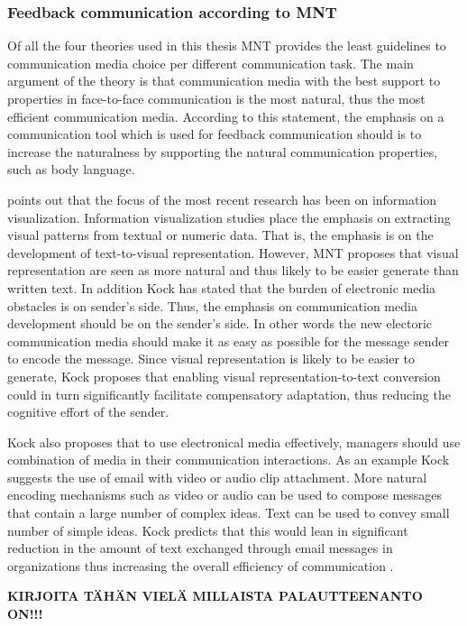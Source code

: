 \documentclass[english,12pt,a4paper,pdftex]{article}
\begin{document}
\subsubsection{Feedback communication according to MNT}

Of all the four theories used in this thesis \ac{MNT} provides the least guidelines to communication media choice per different communication task. The main argument of the theory is that communication media with the best support to properties in face-to-face communication is the most natural, thus the most efficient communication media. According to this statement, the emphasis on a communication tool which is used for feedback communication should is to increase the naturalness by supporting the natural communication properties, such as body language. \citep{kock2005} \citep{kock2004}

\citet{kock2007} points out that the focus of the most recent research has been on information visualization. Information visualization studies place the emphasis on extracting visual patterns from textual or numeric data. That is, the emphasis is on the development of text-to-visual representation. However, \ac{MNT} proposes that visual representation are seen as more natural and thus likely to be easier generate than written text. In addition Kock has stated that the burden of electronic media obstacles is on sender's side. Thus, the emphasis on communication media development should be on the sender's side. In other words the new electoric communication media should make it as easy as possible for the message sender to encode the message. Since visual representation is likely to be easier to generate, Kock proposes that enabling visual representation-to-text conversion could in turn significantly facilitate compensatory adaptation, thus reducing the cognitive effort of the sender.

Kock also proposes that to use electronical media effectively, managers should use combination of media in their communication interactions. As an example Kock suggests the use of email with video or audio clip attachment. More natural encoding mechanisms such as video or audio can be used to compose messages that contain a large number of complex ideas. Text can be used to convey small number of simple ideas. Kock predicts that this would lean in significant reduction in the amount of text exchanged through email messages in organizations thus increasing the overall efficiency of communication \citet{kock2007}.

\textbf{KIRJOITA TÄHÄN VIELÄ MILLAISTA PALAUTTEENANTO ON!!!}
\end{document}
